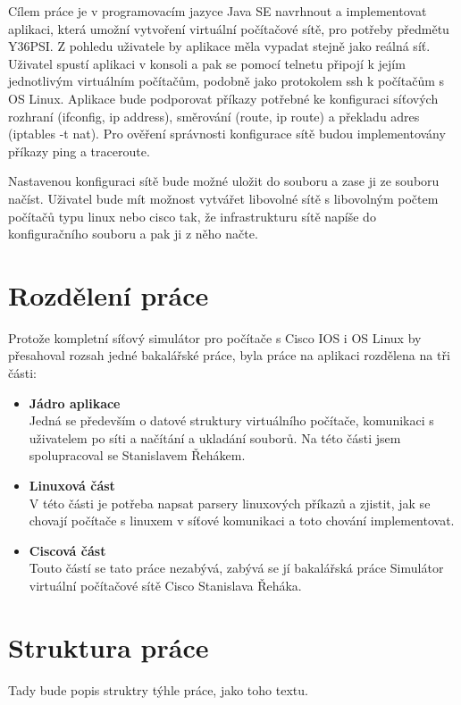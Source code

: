 Cílem práce je v programovacím jazyce Java SE navrhnout a implementovat aplikaci, která umožní vytvoření virtuální počítačové sítě, pro potřeby předmětu Y36PSI. Z pohledu uživatele by aplikace měla vypadat stejně jako reálná síť. Uživatel spustí aplikaci v konsoli a pak se pomocí telnetu připojí k jejím jednotlivým virtuálním počítačům, podobně jako protokolem ssh k počítačům s OS Linux. Aplikace bude podporovat příkazy potřebné ke konfiguraci síťových rozhraní (ifconfig, ip address), směrování (route, ip route) a překladu adres (iptables -t nat). Pro ověření správnosti konfigurace sítě budou implementovány příkazy ping a traceroute.

Nastavenou konfiguraci sítě bude možné uložit do souboru a zase ji ze souboru načíst. Uživatel bude mít možnost vytvářet libovolné sítě s libovolným počtem počítačů typu linux nebo cisco tak, že infrastrukturu sítě napíše do konfiguračního souboru a pak ji z něho načte.


\section{Rozdělení práce}

Protože kompletní síťový simulátor pro počítače s Cisco IOS i OS Linux by přesahoval rozsah jedné bakalářské práce, byla práce na aplikaci rozdělena na tři části:
\begin{itemize}
 \item \textbf{Jádro aplikace}\\ 
Jedná se především o datové struktury virtuálního počítače, komunikaci s uživatelem po síti a načítání a ukladání souborů. Na této části jsem spolupracoval se Stanislavem Řehákem.
 \item \textbf{Linuxová část}\\
V této části je potřeba napsat parsery linuxových příkazů a  zjistit, jak se chovají počítače s linuxem v síťové komunikaci a toto chování implementovat.
 \item \textbf{Ciscová část}\\
Touto částí se tato práce nezabývá, zabývá se jí bakalářská práce Simulátor virtuální počítačové sítě Cisco Stanislava Řeháka.
\end{itemize}


\section{Struktura práce}

Tady bude popis struktry týhle práce, jako toho textu.



